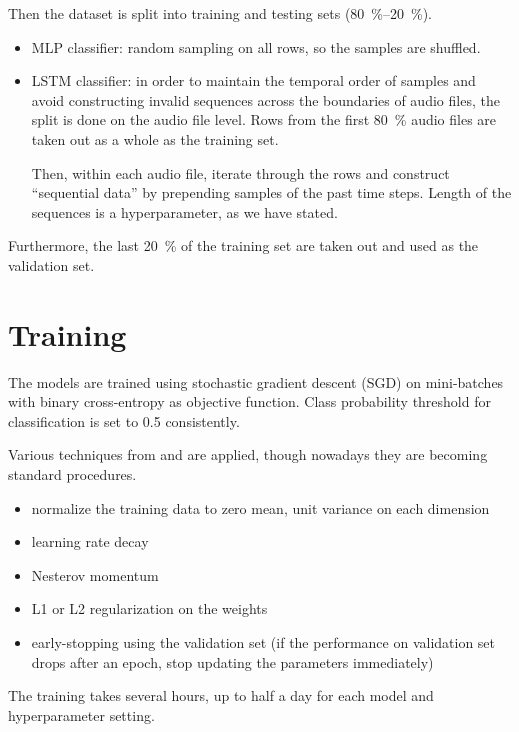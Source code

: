 \documentclass[11pt,a4paper]{report}
\begin{document}
Then the dataset is split into training and testing sets (\SIrange[range-phrase=/]{80}{20}{\percent}).

\begin{itemize}
  \item MLP classifier: random sampling on all rows, so the samples are shuffled.
  \item LSTM classifier: in order to maintain the temporal order of samples and avoid constructing invalid sequences across the boundaries of audio files, the split is done on the audio file level.
    Rows from the first \SI{80}{\percent} audio files are taken out as a whole as the training set.

    Then, within each audio file, iterate through the rows and construct \enquote{sequential data} by prepending samples of the past time steps.
    Length of the sequences is a hyperparameter, as we have stated.
\end{itemize}

Furthermore, the last \SI{20}{\percent} of the training set are taken out and used as the validation set.

\section{Training}

The models are trained using stochastic gradient descent (SGD) on mini-batches with binary cross-entropy as objective function.
Class probability threshold for classification is set to 0.5 consistently.

Various techniques from \parencite{lecun2012efficient} and \parencite{orr2003neural} are applied, though nowadays they are becoming standard procedures.

\begin{itemize}
  \item normalize the training data to zero mean, unit variance on each dimension
  \item learning rate decay
  \item Nesterov momentum \parencite{nesterov1983method}
  \item L1 or L2 regularization on the weights
  \item early-stopping using the validation set (if the performance on validation set drops after an epoch, stop updating the parameters immediately)
\end{itemize}

The training takes several hours, up to half a day for each model and hyperparameter setting.
\end{document}
